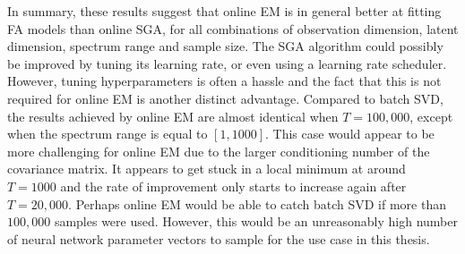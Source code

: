 \documentclass[msc,deptreport.inf]{infthesis} %
\begin{document}
In summary, these results suggest that online EM is in general better at fitting FA models than online SGA, for all combinations of observation dimension, latent dimension, spectrum range and sample size. The SGA algorithm could possibly be improved by tuning its learning rate, or even using a learning rate scheduler. However, tuning hyperparameters is often a hassle and the fact that this is not required for online EM is another distinct advantage. Compared to batch SVD, the results achieved by online EM are almost identical when $T=100,000$, except when the spectrum range is equal to $[1, 1000]$. This case would appear to be more challenging for online EM due to the larger conditioning number of the covariance matrix. It appears to get stuck in a local minimum at around $T=1000$ and the rate of improvement only starts to increase again after $T=20,000$. Perhaps online EM would be able to catch batch SVD if more than $100,000$ samples were used. However, this would be an unreasonably high number of neural network parameter vectors to sample for the use case in this thesis.  
\end{document}
